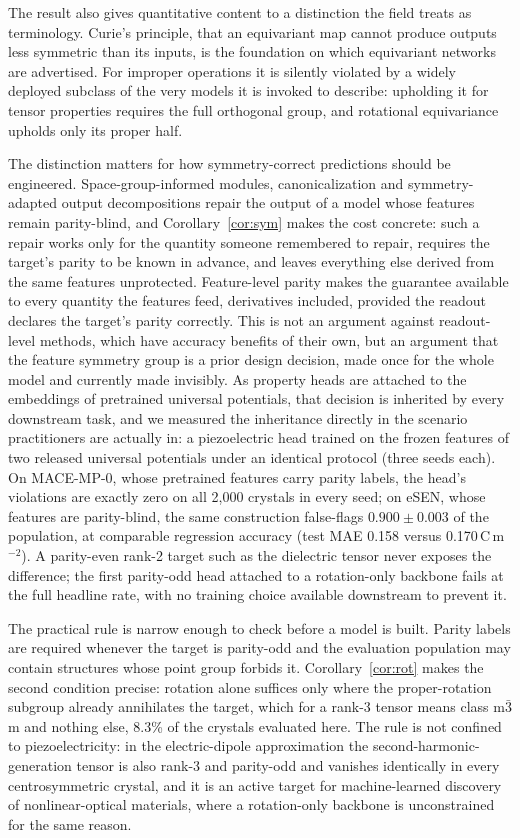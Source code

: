 The result also gives quantitative content to a distinction the field treats as terminology. Curie's principle, that an equivariant map cannot produce outputs less symmetric than its inputs, is the foundation on which equivariant networks are advertised. For improper operations it is silently violated by a widely deployed subclass of the very models it is invoked to describe: upholding it for tensor properties requires the full orthogonal group, and rotational equivariance upholds only its proper half.

The distinction matters for how symmetry-correct predictions should be engineered. Space-group-informed modules, canonicalization and symmetry-adapted output decompositions repair the output of a model whose features remain parity-blind, and Corollary~\ref{cor:sym} makes the cost concrete: such a repair works only for the quantity someone remembered to repair, requires the target's parity to be known in advance, and leaves everything else derived from the same features unprotected. Feature-level parity makes the guarantee available to every quantity the features feed, derivatives included, provided the readout declares the target's parity correctly. This is not an argument against readout-level methods, which have accuracy benefits of their own, but an argument that the feature symmetry group is a prior design decision, made once for the whole model and currently made invisibly. As property heads are attached to the embeddings of pretrained universal potentials, that decision is inherited by every downstream task, and we measured the inheritance directly in the scenario practitioners are actually in: a piezoelectric head trained on the frozen features of two released universal potentials under an identical protocol (three seeds each). On MACE-MP-0, whose pretrained features carry parity labels, the head's violations are exactly zero on all 2,000 crystals in every seed; on eSEN, whose features are parity-blind, the same construction false-flags $0.900 \pm 0.003$ of the population, at comparable regression accuracy (test MAE 0.158 versus 0.170\,C\,m$^{-2}$). A parity-even rank-2 target such as the dielectric tensor never exposes the difference; the first parity-odd head attached to a rotation-only backbone fails at the full headline rate, with no training choice available downstream to prevent it.

The practical rule is narrow enough to check before a model is built. Parity labels are required whenever the target is parity-odd and the evaluation population may contain structures whose point group forbids it. Corollary~\ref{cor:rot} makes the second condition precise: rotation alone suffices only where the proper-rotation subgroup already annihilates the target, which for a rank-3 tensor means class m$\bar 3$m and nothing else, 8.3\% of the crystals evaluated here. The rule is not confined to piezoelectricity: in the electric-dipole approximation the second-harmonic-generation tensor is also rank-3 and parity-odd and vanishes identically in every centrosymmetric crystal, and it is an active target for machine-learned discovery of nonlinear-optical materials\cite{optixnet2026}, where a rotation-only backbone is unconstrained for the same reason.

